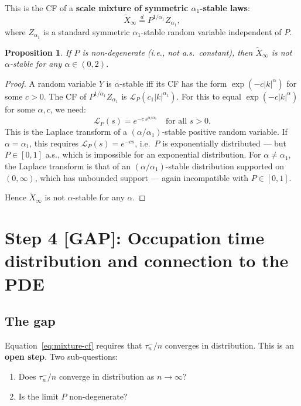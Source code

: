 \documentclass{amsart}
\newtheorem{proposition}[theorem]{Proposition}
\theoremstyle{definition}
\begin{document}
This is the CF of a \textbf{scale mixture of symmetric $\alpha_1$-stable laws}:
\[
    \tilde{X}_\infty \overset{d}{=} P^{1/\alpha_1} Z_{\alpha_1},
\]
where $Z_{\alpha_1}$ is a standard symmetric $\alpha_1$-stable random variable
independent of $P$.

\begin{proposition}
\label{prop:not-stable}
If $P$ is non-degenerate (i.e., not a.s.\ constant), then $\tilde{X}_\infty$
is \emph{not} $\alpha$-stable for any $\alpha \in (0,2)$.
\end{proposition}

\begin{proof}
A random variable $Y$ is $\alpha$-stable iff its CF has the form
$\exp(-c|k|^\alpha)$ for some $c > 0$. The CF of $P^{1/\alpha_1} Z_{\alpha_1}$
is $\mathcal{L}_P(c_1|k|^{\alpha_1})$. For this to equal $\exp(-c|k|^\alpha)$
for some $\alpha, c$, we need:
\[
    \mathcal{L}_P(s) = e^{-c \, s^{\alpha/\alpha_1}} \quad \text{for all } s > 0.
\]
This is the Laplace transform of a $(\alpha/\alpha_1)$-stable positive random variable.
If $\alpha = \alpha_1$, this requires $\mathcal{L}_P(s) = e^{-cs}$, i.e.\ $P$ is
exponentially distributed --- but $P \in [0,1]$ a.s., which is impossible for an
exponential distribution. For $\alpha \neq \alpha_1$, the Laplace transform is that
of an $(\alpha/\alpha_1)$-stable distribution supported on $(0,\infty)$, which has
unbounded support --- again incompatible with $P \in [0,1]$.

Hence $\tilde{X}_\infty$ is not $\alpha$-stable for any $\alpha$.
\end{proof}

\section{Step 4 [GAP]: Occupation time distribution and connection to the PDE}

\subsection{The gap}

Equation~\eqref{eq:mixture-cf} requires that $\tau_n^-/n$ converges in distribution.
This is an \textbf{open step}. Two sub-questions:

\begin{enumerate}
    \item[(G1)] Does $\tau_n^-/n$ converge in distribution as $n \to \infty$?
    \item[(G2)] Is the limit $P$ non-degenerate?
\end{enumerate}
\end{document}
